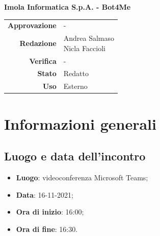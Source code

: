 \documentclass[11pt]{article}
\begin{document}
\begin{titlepage}
\begin{center}
			\large
			\textbf{Imola Informatica S.p.A. - Bot4Me}\\
			
			\vfill
			
			\begin{tabular}{r|l}
				\textbf{Approvazione} &  -\\
				\textbf{Redazione} &  \parbox[t]{3.5cm}{Andrea Salmaso \\Nicla Faccioli}\\
				\textbf{Verifica} &  -\\
				\textbf{Stato} & Redatto \\
				\textbf{Uso} & Esterno
			\end{tabular}
			\vfill
			
		\end{center}
	\end{titlepage}

	\newpage

	\section{Informazioni generali}
	\subsection{Luogo e data dell'incontro}
	\begin{itemize}
		\item \textbf{Luogo}: videoconferenza Microsoft Teams;
		\item \textbf{Data}: 16-11-2021;
		\item \textbf{Ora di inizio}: 16:00;
		\item \textbf{Ora di fine}: 16:30.
	\end{itemize}
	
\end{document}
